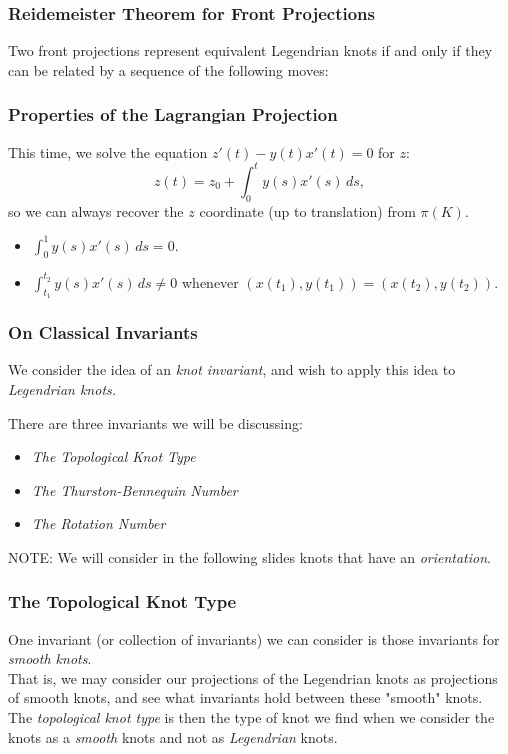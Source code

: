 \documentclass{beamer}
\begin{document}
\begin{frame}
    \frametitle{Reidemeister Theorem for Front Projections}
    \begin{theorem}
        Two front projections represent equivalent Legendrian knots if and only if
        they can be related by a sequence of the following moves:
    \end{theorem}
\end{frame}

\begin{frame}
\frametitle{Properties of the Lagrangian Projection}
    This time, we solve the equation $z'(t) - y(t)x'(t) = 0$ for $z$:
    \[ z(t) = z_0 + \int_0^t y(s)x'(s)\,ds, \]
    so we can always recover the $z$ coordinate (up to translation) from $\pi(K)$.

    \begin{itemize}
    \item $\int_0^1 y(s)x'(s)\,ds = 0$.
    \item $\int_{t_1}^{t_2}y(s)x'(s)\,ds \neq 0$ whenever $(x(t_1),y(t_1))=(x(t_2),y(t_2))$.
    \end{itemize}
\end{frame}

\begin{frame}
    \frametitle{On Classical Invariants}
    We consider the idea of an \textit{knot invariant}, and wish to
    apply this idea to \textit{Legendrian knots.}

    There are three invariants we will be discussing:
    \begin{itemize}
        \item \textit{The Topological Knot Type}
        \item \textit{The Thurston-Bennequin Number}
        \item \textit{The Rotation Number}
    \end{itemize}
    \alert{NOTE}: We will consider in the following slides knots
    that have an \textit{orientation}.
\end{frame}

\begin{frame}
    \frametitle{The Topological Knot Type}
    One invariant (or collection of invariants) we can consider
    is those invariants for \textit{smooth knots}. \\
    That is, we may consider our projections of the Legendrian knots
    as projections of smooth knots, and see what invariants hold
    between these "smooth" knots. \\
    The \textit{topological knot type} is then the type of knot we find
    when we consider the knots as a \textit{smooth} knots and not as 
    \textit{Legendrian} knots. \\
   
\end{frame}
\end{document}
